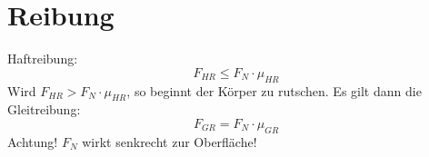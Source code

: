 



\section{Reibung}
Haftreibung: 
\[ \boxed{F_{HR} \leq F_N \cdot \mu_{HR}} \]
Wird $F_{HR} > F_N \cdot \mu_{HR}$, so beginnt der Körper zu rutschen. 
Es gilt dann die Gleitreibung: 
\[ \boxed{F_{GR} = F_N \cdot \mu_{GR}} \]
Achtung! $F_N$ wirkt senkrecht zur Oberfläche! 